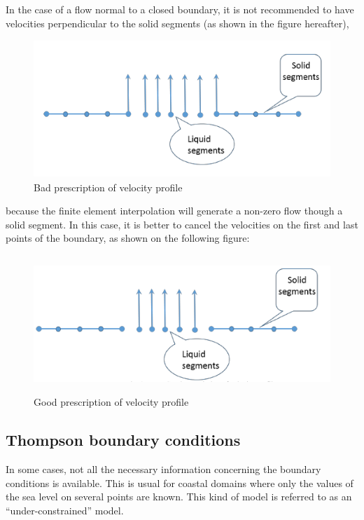  In the case of a flow normal to a closed boundary, it is not recommended to have velocities perpendicular to the solid segments (as shown in the figure hereafter),
\begin{figure}
\includegraphics*[width=5.24in, height=2.04in, keepaspectratio=false]{./graphics/bad_profile.png}
\caption{Bad prescription of velocity profile}
\end{figure} 

 because the finite element interpolation will generate a non-zero flow though a solid segment. In this case, it is better to cancel the velocities on the first and last points of the boundary, as shown on the following figure:

\begin{figure}
\includegraphics*[width=5.24in, height=2.04in, keepaspectratio=false]{./graphics/good_profile.png}
\caption{Good prescription of velocity profile}
\end{figure} 


\subsection{  Thompson boundary conditions}

 In some cases, not all the necessary information concerning the boundary conditions is available. This is usual for coastal domains where only the values of the sea level on several points are known. This kind of model is referred to as an ``under-constrained'' model.

